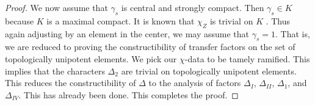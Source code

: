 \begin{proof}
We now assume that $\gamma_s$ is central and strongly compact.  Then
$\gamma_s\in K$ because $K$ is a maximal compact.  It is known that
$\chi_Z$ is trivial on $K$ \cite[Lemma
3.2]{hales1995fundamental}. Thus again adjusting by an element in the
center, we may assume that $\gamma_s=1$.  That is, we are reduced to
proving the constructibility of transfer factors on the set of
topologically unipotent elements.  We pick our $\chi$-data to be
tamely ramified.  This implies that the characters $\Delta_2$ are
trivial on topologically unipotent elements.  This reduces
the constructibility of $\Delta$ to the analysis of factors $\Delta_I$, $\Delta_{II}$,
$\Delta_1$, and $\Delta_{IV}$.  This has already been done.  This
completes the proof.
\end{proof}


